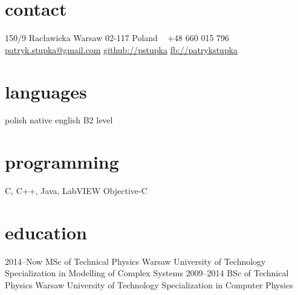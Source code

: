 \documentclass[]{friggeri-cv} %
\begin{document}


\begin{aside} %
\section{contact}
150/9 Racławicka
Warsaw 02-117
Poland
~
+48 660 015 796
~
\href{mailto:patryk.stupka@gmail.com}{patryk.stupka@gmail.com}
\href{https://github.com/pstupka/}{github://pstupka}
\href{http://facebook.com/patrykstupka}{fb://patrykstupka}
\section{languages}
polish native
english B2 level
\section{programming}
C, C++, Java, LabVIEW
Objective-C
\end{aside}


\section{education}

\begin{entrylist}
\entry
	{2014--Now}
	{MSc {\normalfont of Technical Physics}}
	{Warsaw University of Technology}
	{Specialization in Modelling of Complex Systems}
\entry
	{2009--2014}
	{BSc {\normalfont of Technical Physics}}
	{Warsaw University of Technology}
	{Specialization in Computer Physics}
\end{entrylist}

\end{document}

